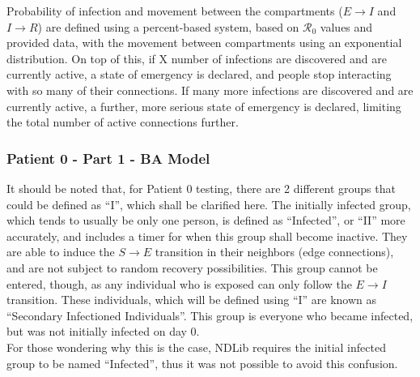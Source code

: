 \documentclass{article}
\numberwithin{equation}{section} %
\begin{document}
\begin{multicols}{2}
  Probability of infection and movement between the compartments ($E \rightarrow I$ and $I \rightarrow R$) are defined using a percent-based system, based on $\mathcal{R}_0$ values and provided data, with the movement between compartments using an exponential distribution. On top of this, if X number of infections are discovered and are currently active, a state of emergency is declared, and people stop interacting with so many of their connections. If many more infections are discovered and are currently active, a further, more serious state of emergency is declared, limiting the total number of active connections further. 

  \subsubsection{Patient 0 - Part 1 - BA Model}
  It should be noted that, for Patient 0 testing, there are 2 different groups that could be defined as ``I'', which shall be clarified here. The initially infected group, which tends to usually be only one person, is defined as ``Infected'', or ``II'' more accurately, and includes a timer for when this group shall become inactive. They are able to induce the $S \rightarrow E$ transition in their neighbors (edge connections), and are not subject to random recovery possibilities. This group cannot be entered, though, as any individual who is exposed can only follow the $E \rightarrow I$ transition. These individuals, which will be defined using ``I'' are known as ``Secondary Infectioned Individuals''. This group is everyone who became infected, but was not initially infected on day 0. \\

  For those wondering why this is the case, NDLib requires the initial infected group to be named ``Infected'', thus it was not possible to avoid this confusion. \\
  

\end{multicols}
\end{document}
